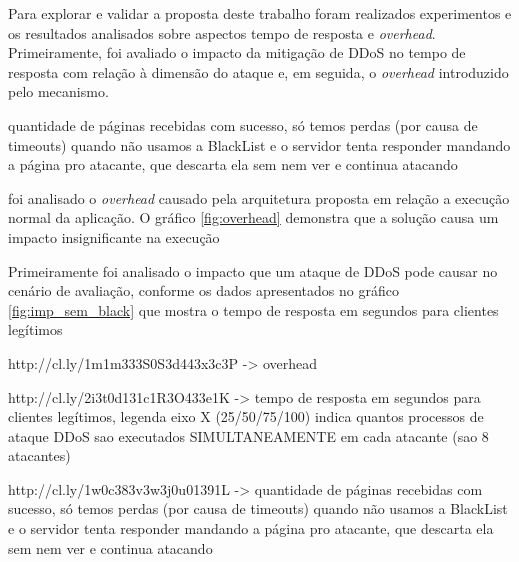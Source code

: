 
Para explorar e validar a proposta deste trabalho foram realizados experimentos e os resultados analisados sobre aspectos tempo de resposta e \emph{overhead}. Primeiramente, foi avaliado o impacto da mitigação de DDoS no tempo de resposta com relação à dimensão do ataque e, em seguida, o \emph{overhead} introduzido pelo mecanismo.

quantidade de páginas recebidas com sucesso, só temos perdas (por causa de timeouts) quando não usamos a BlackList e o servidor tenta responder mandando a página pro atacante, que descarta ela sem nem ver e continua atacando


foi analisado o \emph{overhead} causado pela arquitetura proposta em relação a execução normal da aplicação. O gráfico \ref{fig:overhead} demonstra que a solução causa um impacto insignificante na execução 

Primeiramente foi analisado o impacto que um ataque de DDoS pode causar no cenário de avaliação, conforme os dados apresentados no gráfico \ref{fig:imp_sem_black} que mostra o tempo de resposta em segundos para clientes legítimos


http://cl.ly/1m1m333S0S3d443x3c3P -> overhead



http://cl.ly/2i3t0d131c1R3O433e1K -> tempo de resposta em segundos para clientes legítimos, legenda eixo X (25/50/75/100) indica quantos processos de ataque DDoS sao executados SIMULTANEAMENTE em cada atacante (sao 8 atacantes)



http://cl.ly/1w0c383v3w3j0u01391L -> quantidade de páginas recebidas com sucesso, só temos perdas (por causa de timeouts) quando não usamos a BlackList e o servidor tenta responder mandando a página pro atacante, que descarta ela sem nem ver e continua atacando


